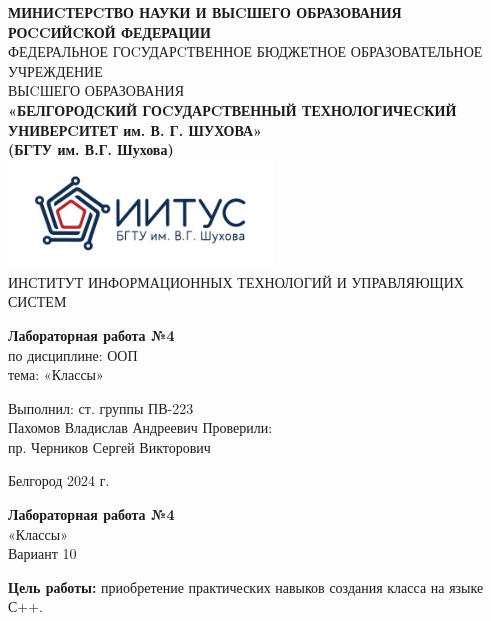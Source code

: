 \documentclass[a4paper,14pt]{extarticle}
\newcommand\textbox[1]{
	\parbox{.45\textwidth}{#1}
}
\begin{document}
\begin{center}
    \small{
        \textbf{МИНИCТЕРCТВО НАУКИ И ВЫCШЕГО ОБРАЗОВАНИЯ РОCCИЙCКОЙ ФЕДЕРАЦИИ}\\
        ФЕДЕРАЛЬНОЕ ГОCУДАРCТВЕННОЕ БЮДЖЕТНОЕ ОБРАЗОВАТЕЛЬНОЕ УЧРЕЖДЕНИЕ\\ВЫCШЕГО ОБРАЗОВАНИЯ \\
        \textbf{«БЕЛГОРОДCКИЙ ГОCУДАРCТВЕННЫЙ ТЕХНОЛОГИЧЕCКИЙ\\УНИВЕРCИТЕТ им. В. Г. ШУХОВА»\\ (БГТУ им. В.Г. Шухова)} \\
        \bigbreak
        \includegraphics[width=70mm]{log}\\
        ИНСТИТУТ ИНФОРМАЦИОННЫХ ТЕХНОЛОГИЙ И УПРАВЛЯЮЩИХ СИСТЕМ\\}
\end{center}

\vfill
\begin{center}
    \large{
        \textbf{
            Лабораторная работа №4}}\\
    \normalsize{
        по дисциплине: ООП \\
        тема: «Классы»}
\end{center}
\vfill
\hfill\textbox{
    Выполнил: ст. группы ПВ-223\\Пахомов Владислав Андреевич
    \bigbreak
    Проверили: \\пр. Черников Сергей Викторович
}
\vfill\begin{center}
    Белгород 2024 г.
\end{center}
\newpage
\begin{center}
    \textbf{Лабораторная работа №4}\\
    «Классы»\\
    Вариант 10
\end{center}
\textbf{Цель работы: }приобретение практических навыков создания класса на
языке С++.
\end{document}
